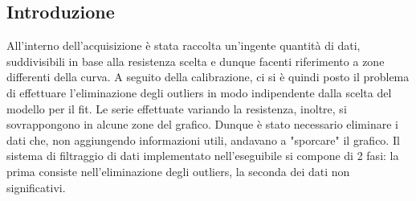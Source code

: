 \documentclass{article}[a4paper, oneside, 11pt]
\begin{document}
\subsection{Introduzione}
All'interno dell'acquisizione \`e stata raccolta un'ingente quantit\`a di dati,
suddivisibili in base alla resistenza scelta e dunque facenti riferimento
a zone differenti della curva. A seguito della calibrazione, ci si \`e quindi
posto il problema di effettuare l'eliminazione degli outliers in modo
indipendente dalla scelta del modello per il fit. Le serie effettuate
variando la resistenza, inoltre, si sovrappongono in alcune zone del
grafico. Dunque \`e stato necessario eliminare i dati che, non aggiungendo
informazioni utili, andavano a "sporcare" il grafico. Il sistema di filtraggio
di dati implementato nell'eseguibile si compone di 2 fasi:
la prima consiste nell'eliminazione degli outliers, la seconda dei dati non
significativi.
\end{document}
